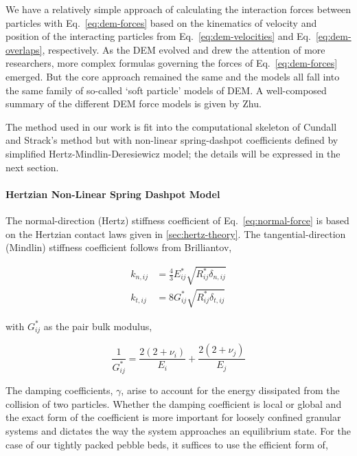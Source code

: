 We have a relatively simple approach of calculating the interaction forces between particles with Eq.~\ref{eq:dem-forces} based on the kinematics of velocity and position of the interacting particles from Eq.~\ref{eq:dem-velocities} and Eq.~\ref{eq:dem-overlaps}, respectively. As the DEM evolved and drew the attention of more researchers, more complex formulas governing the forces of Eq.~\ref{eq:dem-forces} emerged. But the core approach remained the same and the models all fall into the same family of so-called `soft particle' models of DEM. A well-composed summary of the different DEM force models is given by Zhu\etal\cite{Zhu2007}.

The method used in our work is fit into the computational skeleton of Cundall and Strack's method but with non-linear spring-dashpot coefficients defined by simplified Hertz-Mindlin-Deresiewicz model; the details will be expressed in the next section.



\paragraph{Hertzian Non-Linear Spring Dashpot Model}

The normal-direction (Hertz) stiffness coefficient of Eq.~\ref{eq:normal-force} is based on the Hertzian contact laws given in \cref{sec:hertz-theory}. The tangential-direction (Mindlin) stiffness coefficient follows from Brilliantov\cite{Brilliantov1996, Zhu2007, Langston1995},

\begin{subequations}
\begin{align}
	k_{n,ij} &= \frac{4}{3}E_{ij}^*\sqrt{R_{ij}^*\delta_{n,ij}} \\
	k_{t,ij} &= 8 G_{ij}^*\sqrt{R_{ij}^*\delta_{t,ij}}
\end{align}
\end{subequations}

with $G_{ij}^*$ as the pair bulk modulus,

\begin{equation}
	\frac{1}{G^*_{ij}} = \frac{2(2+\nu_i)}{E_i} + \frac{2(2+\nu_j)}{E_j}
\end{equation}

The damping coefficients, $\gamma$, arise to account for the energy dissipated from the collision of two particles\cite{DiRenzo2004, Tsuji1992, Tsuji1993}. Whether the damping coefficient is local or global and the exact form of the coefficient is more important for loosely confined granular systems and dictates the way the system approaches an equilibrium state\cite{Makse2004}. For the case of our tightly packed pebble beds, it suffices to use the efficient form of\cite{Dippel1996, Makse2004, Brilliantov1996, Zhang2005, Zhu2007},

